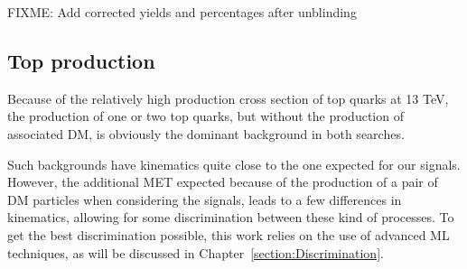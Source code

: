 \documentclass[a4paper, 10pt, openright]{report}
\begin{document}
\begin{table}
\begin{center}
\caption{Number of yields and percentage of different processes in some of the 2018 signal regions.}
\label{tab:yields}
\end{center}
\end{table}	

\color{red} FIXME: Add corrected yields and percentages after unblinding \color{black}

\subsection{Top production}

Because of the relatively high production cross section of top quarks at 13 TeV, the production of one or two top quarks, but without the production of associated \ac{DM}, is obviously the dominant background in both searches. 

Such backgrounds have kinematics quite close to the one expected for our signals. However, the additional \ac{MET} expected because of the production of a pair of \ac{DM} particles when considering the signals, leads to a few differences in kinematics, allowing for some discrimination between these kind of processes. To get the best discrimination possible, this work relies on the use of advanced \acf{ML} techniques, as will be discussed in Chapter~\ref{section:Discrimination}. %
\end{document}
